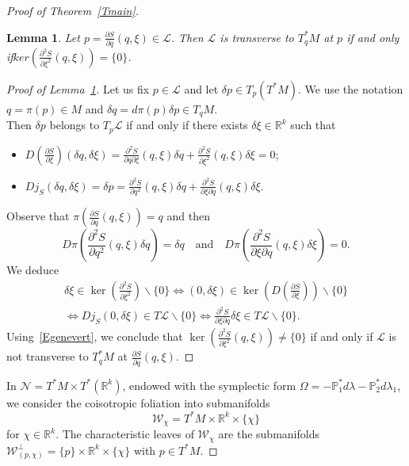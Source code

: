 \documentclass[10pt,a4paper]{amsart}
\numberwithin{equation}{section}
\newcommand*\cl{\mathcal{L}}
\newcommand*\cw{\mathcal{W}}
\newcommand*\cal{\mathcal}
\newcommand*\R{\mathbb{R}}
\newcommand{\bbP}{\mathbb{P}}
\newtheorem{lemm}[theo]{Lemma}
\theoremstyle{definition}
\theoremstyle{remark}
\begin{document}
\begin{proof}[Proof of Theorem~\ref{Tmain}]

\begin{lemm}\label{Lcaractvert}
Let $p=\frac{\partial S}{\partial q}(q, \xi)\in \cl$. Then $\cl$ is transverse to $T^*_qM$ at $p$ if and only if$ker (\frac{\partial^2 S}{\partial \xi^2}(q, \xi))=\{ 0\}$.
\end{lemm}
\begin{proof}[Proof of Lemma~\ref{Lcaractvert}]
Let us fix $p\in \cl$ and let $\delta p\in T_p(T^*M)$. We use the notation $q=\pi(p)\in M$ and $\delta q= d\pi(p)\delta p\in T_qM$.\\
Then $\delta p$ belongs to $T_{p}\cl$ if and only if there exists $\delta\xi\in \R^k$ such that
\begin{itemize}
\item ${D(\frac{\partial S}{\partial \xi})(\delta q, \delta \xi)=}\frac{\partial^2 S}{\partial q\partial \xi}(q, \xi)\delta q+\frac{\partial^2 S}{\partial \xi^2}(q, \xi)\delta \xi=0$;
\item ${ Dj_S(\delta q, \delta \xi)=}\delta p=\frac{\partial^2 S}{\partial q^2}(q, \xi)\delta q+\frac{\partial^2 S}{\partial \xi\partial q}(q, \xi)\delta \xi$.
\end{itemize}
Observe that $\pi(\frac{\partial S}{\partial q}(q, \xi))=q$ and then
\begin{equation}\label{Egenevert}
D\pi\left(\frac{\partial^2S}{\partial q^2}(q, \xi)\delta q\right)=\delta q\quad\text{and}\quad D\pi\left(\frac{\partial^2S}{\partial \xi\partial q}(q, \xi)\delta \xi\right)=0.
\end{equation}
We deduce
\begin{gather*}
\delta\xi\in\ker \left(\frac{\partial^2S}{\partial\xi^2}\right)\backslash\{ 0\}\Longleftrightarrow(0, \delta \xi)\in \ker\left(D\left(\frac{\partial S}{\partial \xi}\right)\right)\backslash\{ 0\}
\\
\Longleftrightarrow Dj_S(0, \delta \xi)\in T\cl\backslash\{ 0\}\Longleftrightarrow\frac{\partial^2S}{\partial \xi\partial q}\delta\xi\in T\cl\backslash\{0\}.
\end{gather*}
Using~\eqref{Egenevert}, we conclude that $\ker (\frac{\partial^2 S}{\partial \xi^2}(q, \xi))\neq\{ 0\}$ if and only if $\cl$ is not transverse to $T^*_qM$ at $\frac{\partial S}{\partial q}(q, \xi)$.
\end{proof}

In ${\cal N}=T^*M\times T^*(\R^k)$, endowed with the symplectic form $\Omega${$=-\bbP_1^*d\lambda-\bbP_2^*d\lambda_1$}, we consider the coisotropic foliation into submanifolds
\[
\cw_\chi=T^*M\times \R^k\times \{\chi\}
\]
for $\chi\in \R^k$. The characteristic leaves of $\cw_\chi$ are the submanifolds $\cw^\bot_{(p,\chi)}=\{ p\}\times \R^k\times \{\chi\}$ with $ p\in T^*M$.




\end{proof}
\end{document}
